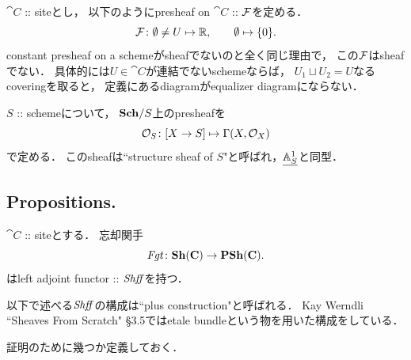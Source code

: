 \documentclass[a4paper, dvipdfmx]{jsarticle}
\begin{document}
\begin{Example}
    $\cat{C}$ :: siteとし，
    以下のようにpresheaf on $\cat{C}$ :: $\mathcal{F}$を定める．
    \[ \mathcal{F} \colon \emptyset \neq U \mapsto \mathbb{R}, \qquad \emptyset \mapsto \{0\}.  \]
    constant presheaf on a schemeがsheafでないのと全く同じ理由で，
    この$\mathcal{F}$はsheafでない．
    具体的には$U \in \cat{C}$が連結でないschemeならば，
    $U_1 \sqcup U_2=U$なるcoveringを取ると，
    定義にあるdiagramがequalizer diagramにならない．
\end{Example}

\begin{Example}
    $S$ :: schemeについて，
    $\mathbf{Sch}/S$上のpresheafを
    \[ \mathcal{O}_S \colon [X \to S] \mapsto \Gamma(X, \mathcal{O}_X) \]
    で定める．
    このsheafは``structure sheaf of $S$"と呼ばれ，$\underline{\mathbb{A}^1_S}$と同型．
\end{Example}

\subsection{Propositions.}
\begin{Thm}\label{thm:Shff}
    $\cat{C}$ :: siteとする．
    忘却関手
    \[ \mathit{Fgt} \colon \mathbf{Sh}(\mathbf{C}) \to \mathbf{PSh}(\mathbf{C}). \]
    はleft adjoint functor :: $\mathit{Shff}$を持つ．
\end{Thm}
\begin{Remark}
    以下で述べる$\mathit{Shff}$の構成は``plus construction"と呼ばれる．
    Kay Werndli ``Sheaves From Scratch" \S3.5ではetale bundleという物を用いた構成をしている．
\end{Remark}

証明のために幾つか定義しておく．
\end{document}
